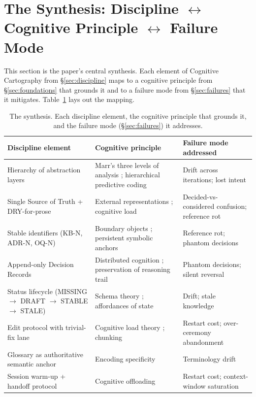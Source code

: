 \documentclass[11pt,a4paper,twocolumn]{article}
\begin{document}
\section{The Synthesis: Discipline $\leftrightarrow$ Cognitive Principle $\leftrightarrow$ Failure Mode}
\label{sec:synthesis}

This section is the paper's central synthesis. Each element of
Cognitive Cartography from \S\ref{sec:discipline} maps to a
cognitive principle from \S\ref{sec:foundations} that grounds it
and to a failure mode from \S\ref{sec:failures} that it mitigates.
Table~\ref{tab:synthesis} lays out the mapping.

\begin{table}[t]
\centering
\small
\begin{tabular}{p{4.4cm} p{5.7cm} p{5.4cm}}
\toprule
\textbf{Discipline element} & \textbf{Cognitive principle} & \textbf{Failure mode addressed} \\
\midrule
Hierarchy of abstraction layers & Marr's three levels of analysis \citep{marr1982vision}; hierarchical predictive coding \citep{clark2013whatever} & Drift across iterations; lost intent \\
Single Source of Truth + DRY-for-prose & External representations \citep{scaife1996external}; cognitive load \citep{sweller1988cognitive} & Decided-vs-considered confusion; reference rot \\
Stable identifiers (KB-N, ADR-N, OQ-N) & Boundary objects \citep{star1989boundary}; persistent symbolic anchors & Reference rot; phantom decisions \\
Append-only Decision Records & Distributed cognition \citep{hutchins1995}; preservation of reasoning trail & Phantom decisions; silent reversal \\
Status lifecycle (MISSING $\to$ DRAFT $\to$ STABLE $\to$ STALE) & Schema theory \citep{bartlett1932remembering}; affordances of state & Drift; stale knowledge \\
Edit protocol with trivial-fix lane & Cognitive load theory \citep{sweller1988cognitive}; chunking \citep{miller1956magical, cowan2001magical} & Restart cost; over-ceremony abandonment \\
Glossary as authoritative semantic anchor & Encoding specificity \citep{tulving1973encoding} & Terminology drift \\
Session warm-up + handoff protocol & Cognitive offloading \citep{risko2016offloading} & Restart cost; context-window saturation \\
\bottomrule
\end{tabular}
\caption{The synthesis. Each discipline element, the cognitive
principle that grounds it, and the failure mode (\S\ref{sec:failures})
it addresses.}
\label{tab:synthesis}
\end{table}
\end{document}
